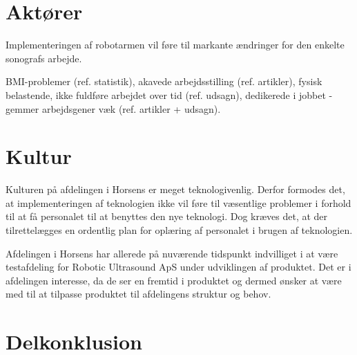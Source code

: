 \section{Aktører}
Implementeringen af robotarmen vil føre til markante ændringer for den enkelte sonografs arbejde.

BMI-problemer (ref. statistik), akavede arbejdsstilling (ref. artikler), fysisk belastende, ikke fuldføre arbejdet over tid (ref. udsagn), dedikerede i jobbet - gemmer arbejdsgener væk (ref. artikler + udsagn).

\section{Kultur}
Kulturen på afdelingen i Horsens er meget teknologivenlig. Derfor formodes det, at implementeringen af teknologien ikke vil føre til væsentlige problemer i forhold til at få personalet til at benyttes den nye teknologi. Dog kræves det, at der tilrettelægges en ordentlig plan for oplæring af personalet i brugen af teknologien. 

Afdelingen i Horsens har allerede på nuværende tidspunkt indvilliget i at være testafdeling for Robotic Ultrasound ApS under udviklingen af produktet. Det er i afdelingen interesse, da de ser en fremtid i produktet og dermed ønsker at være med til at tilpasse produktet til afdelingens struktur og behov.   

\section{Delkonklusion}

